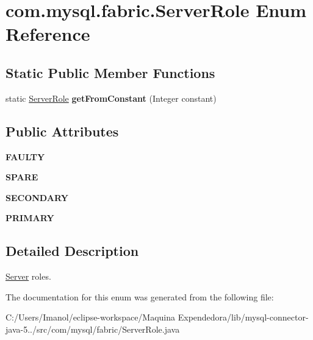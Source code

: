 \hypertarget{enumcom_1_1mysql_1_1fabric_1_1_server_role}{}\section{com.\+mysql.\+fabric.\+Server\+Role Enum Reference}
\label{enumcom_1_1mysql_1_1fabric_1_1_server_role}
\subsection*{Static Public Member Functions}
\begin{DoxyCompactItemize}
\item 
\mbox{\label{enumcom_1_1mysql_1_1fabric_1_1_server_role_ae0136b2224de60d7049f5f652eef6622}} 
static \mbox{\hyperlink{enumcom_1_1mysql_1_1fabric_1_1_server_role}{Server\+Role}} {\bfseries get\+From\+Constant} (Integer constant)
\end{DoxyCompactItemize}
\subsection*{Public Attributes}
\begin{DoxyCompactItemize}
\item 
\mbox{\label{enumcom_1_1mysql_1_1fabric_1_1_server_role_a50e297427e5378eb2975cf898758e332}} 
{\bfseries F\+A\+U\+L\+TY}
\item 
\mbox{\label{enumcom_1_1mysql_1_1fabric_1_1_server_role_a73bd76471a2f03253306218a24f38549}} 
{\bfseries S\+P\+A\+RE}
\item 
\mbox{\label{enumcom_1_1mysql_1_1fabric_1_1_server_role_abd881cf48270520c368955c490efe727}} 
{\bfseries S\+E\+C\+O\+N\+D\+A\+RY}
\item 
\mbox{\label{enumcom_1_1mysql_1_1fabric_1_1_server_role_a4fdcfdf9880912b40aedcec98737e93e}} 
{\bfseries P\+R\+I\+M\+A\+RY}
\end{DoxyCompactItemize}


\subsection{Detailed Description}
\mbox{\hyperlink{classcom_1_1mysql_1_1fabric_1_1_server}{Server}} roles. 

The documentation for this enum was generated from the following file\+:\begin{DoxyCompactItemize}
\item 
C\+:/\+Users/\+Imanol/eclipse-\/workspace/\+Maquina Expendedora/lib/mysql-\/connector-\/java-\/5../src/com/mysql/fabric/Server\+Role.\+java\end{DoxyCompactItemize}
